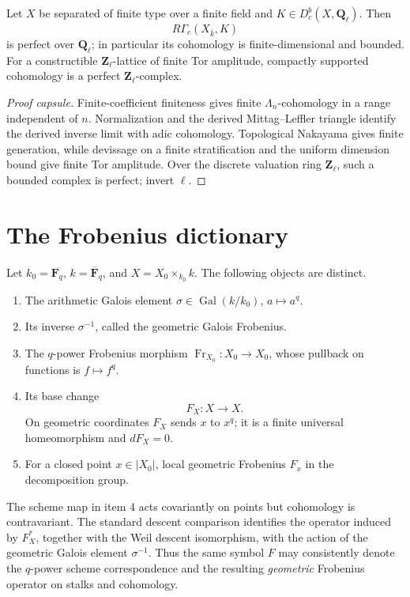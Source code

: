 \begin{theorem}
\label{thm:adic-perfectness}
Let \(X\) be separated of finite type over a finite field and
\(K\in D^b_c(X,\mathbf Q_\ell)\).  Then
\[
 R\Gamma_c(X_{\bar k},K)
\]
is perfect over \(\mathbf Q_\ell\); in particular its cohomology is
finite-dimensional and bounded.  For a constructible
\(\mathbf Z_\ell\)-lattice of finite Tor amplitude, compactly supported
cohomology is a perfect \(\mathbf Z_\ell\)-complex.
\end{theorem}

\begin{proof}[Proof capsule]
Finite-coefficient finiteness gives finite \(\Lambda_n\)-cohomology in a
range independent of \(n\).  Normalization and the derived
Mittag--Leffler triangle identify the derived inverse limit with adic
cohomology.  Topological Nakayama gives finite generation, while devissage on
a finite stratification and the uniform dimension bound give finite Tor
amplitude.  Over the discrete valuation ring \(\mathbf Z_\ell\), such a
bounded complex is perfect; invert \(\ell\).
\end{proof}

\section{The Frobenius dictionary}

Let \(k_0=\mathbf F_q\), \(k=\overline{\mathbf F}_q\), and
\(X=X_0\times_{k_0}k\).  The following objects are distinct.
\begin{enumerate}
\item The arithmetic Galois element
\(\sigma\in\operatorname{Gal}(k/k_0)\), \(a\mapsto a^q\).
\item Its inverse \(\sigma^{-1}\), called the geometric Galois Frobenius.
\item The \(q\)-power Frobenius morphism
\(\operatorname{Fr}_{X_0}:X_0\to X_0\), whose pullback on functions is
\(f\mapsto f^q\).
\item Its base change
\[
 F_X:X\longrightarrow X.
\]
On geometric coordinates \(F_X\) sends \(x\) to \(x^q\); it is a finite
universal homeomorphism and \(dF_X=0\).
\item For a closed point \(x\in|X_0|\), local geometric Frobenius \(F_x\) in
the decomposition group.
\end{enumerate}

The scheme map in item 4 acts covariantly on points but cohomology is
contravariant.  The standard descent comparison identifies the operator
induced by \(F_X^*\), together with the Weil descent isomorphism, with the
action of the geometric Galois element \(\sigma^{-1}\).  Thus the same symbol
\(F\) may consistently denote the \(q\)-power scheme correspondence and the
resulting \emph{geometric} Frobenius operator on stalks and cohomology.

